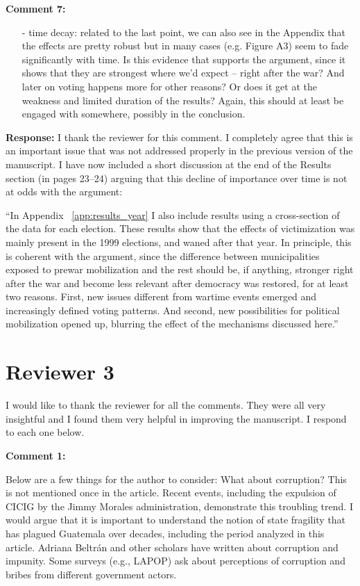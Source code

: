 \documentclass[12pt, a4paper, notitlepage]{article}
\begin{document}
\vspace{15pt}
\noindent\textbf{Comment 7:}
\begin{displayquote}
\begin{itemize}
\item[-] time decay: related to the last point, we can also see in the Appendix that the effects are pretty robust but in many cases (e.g. Figure A3) seem to fade significantly with time. Is this evidence that supports the argument, since it shows that they are strongest where we’d expect – right after the war? And later on voting happens more for other reasons? Or does it get at the weakness and limited duration of the results? Again, this should at least be engaged with somewhere, possibly in the conclusion.
\end{itemize}
\end{displayquote}

\noindent\textbf{Response:} I thank the reviewer for this comment. I completely agree that this is an important issue that was not addressed properly in the previous version of the manuscript. I have now included a short discussion at the end of the Results section (in pages 23--24) arguing that this decline of importance over time is not at odds with the argument:

``In Appendix ~\ref{app:results_year} I also include results using a cross-section of the data for each election.
These results show that the effects of victimization was mainly present in the 1999 elections, and waned after that year.
In principle, this is coherent with the argument, since the difference between municipalities exposed to prewar mobilization and the rest should be, if anything, stronger right after the war and become less relevant after democracy was restored, for at least two reasons.
First, new issues different from wartime events emerged and increasingly defined voting patterns.
And second, new possibilities for political mobilization opened up, blurring the effect of the mechanisms discussed here.''

\newpage
\section*{Reviewer 3}

I would like to thank the reviewer for all the comments. They were all very insightful and I found them very helpful in improving the manuscript. I respond to each one below.

\vspace{15pt}
\noindent\textbf{Comment 1:}
\begin{displayquote}
Below are a few things for the author to consider:
What about corruption? This is not mentioned once in the article. Recent events, including the expulsion of CICIG by the Jimmy Morales administration, demonstrate this troubling trend. I would argue that it is important to understand the notion of state fragility that has plagued Guatemala over decades, including the period analyzed in this article. Adriana Beltrán and other scholars have written about corruption and impunity. Some surveys (e.g., LAPOP) ask about perceptions of corruption and bribes from different government actors.
\end{displayquote}
\end{document}
